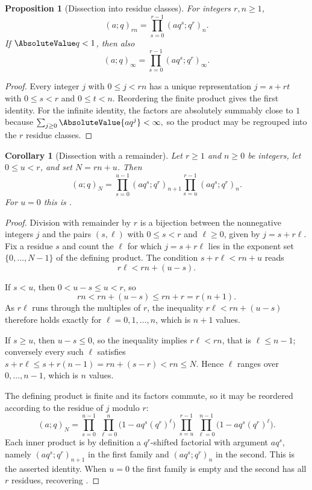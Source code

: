 \documentclass[11pt,a4paper,oneside,openany]{book}
\newtheorem{proposition}[proposition]{Proposition}
\newtheorem{corollary}[corollary]{Corollary}
\theoremstyle{definition}
\theoremstyle{remark}
\begin{document}
\begin{proposition}[Dissection into residue classes]\label{prop:dissection}
For integers $r,n\ge1$,
\[
 (a;q)_{rn}=\prod_{s=0}^{r-1}(aq^s;q^r)_n.
\]
If $\AbsoluteValue q<1$, then also
\[
 (a;q)_\infty=\prod_{s=0}^{r-1}(aq^s;q^r)_\infty.
\]
\end{proposition}

\begin{proof}
Every integer $j$ with $0\le j<rn$ has a unique representation $j=s+rt$ with $0\le s<r$ and $0\le t<n$.  Reordering the finite product gives the first identity.  For the infinite identity, the factors are absolutely summably close to $1$ because
\(
 \sum_{j\ge0}\AbsoluteValue{a q^j}<\infty,
\)
so the product may be regrouped into the $r$ residue classes.
\end{proof}

\begin{corollary}[Dissection with a remainder]\label{cor:dissection-remainder}
Let $r\ge1$ and $n\ge0$ be integers, let $0\le u<r$, and set $N=rn+u$.  Then
\[
 (a;q)_N
 =\prod_{s=0}^{u-1}(aq^s;q^r)_{n+1}
  \prod_{s=u}^{r-1}(aq^s;q^r)_n .
\]
For $u=0$ this is .
\end{corollary}

\begin{proof}
Division with remainder by $r$ is a bijection between the nonnegative integers $j$ and the pairs $(s,\ell)$ with $0\le s<r$ and $\ell\ge0$, given by $j=s+r\ell$.  Fix a residue $s$ and count the $\ell$ for which $j=s+r\ell$ lies in the exponent set $\{0,\ldots,N-1\}$ of the defining product.  The condition $s+r\ell<rn+u$ reads
\[
 r\ell<rn+(u-s).
\]

If $s<u$, then $0<u-s\le u<r$, so
\[
 rn<rn+(u-s)\le rn+r=r(n+1).
\]
As $r\ell$ runs through the multiples of $r$, the inequality $r\ell<rn+(u-s)$ therefore holds exactly for $\ell=0,1,\ldots,n$, which is $n+1$ values.

If $s\ge u$, then $u-s\le0$, so the inequality implies $r\ell<rn$, that is $\ell\le n-1$; conversely every such $\ell$ satisfies $s+r\ell\le s+r(n-1)=rn+(s-r)<rn\le N$.  Hence $\ell$ ranges over $0,\ldots,n-1$, which is $n$ values.

The defining product is finite and its factors commute, so it may be reordered according to the residue of $j$ modulo $r$:
\[
 (a;q)_N
 =\prod_{s=0}^{u-1}\ \prod_{\ell=0}^{n}\bigl(1-aq^{s}(q^{r})^{\ell}\bigr)\;
  \prod_{s=u}^{r-1}\ \prod_{\ell=0}^{n-1}\bigl(1-aq^{s}(q^{r})^{\ell}\bigr).
\]
Each inner product is by definition a $q^r$-shifted factorial with argument $aq^s$, namely $(aq^s;q^r)_{n+1}$ in the first family and $(aq^s;q^r)_n$ in the second.  This is the asserted identity.  When $u=0$ the first family is empty and the second has all $r$ residues, recovering .
\end{proof}
\end{document}
